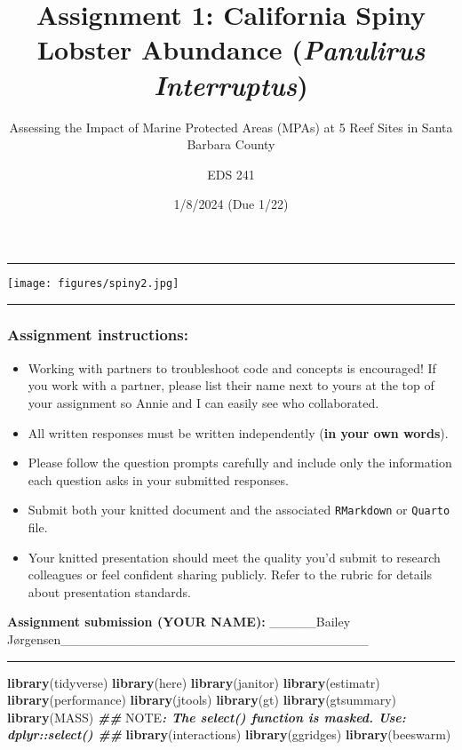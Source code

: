 \documentclass[
]{article}
\title{Assignment 1: California Spiny Lobster Abundance (\emph{Panulirus
Interruptus})}
\subtitle{Assessing the Impact of Marine Protected Areas (MPAs) at 5
Reef Sites in Santa Barbara County}
\author{EDS 241}
\date{1/8/2024 (Due 1/22)}
\newenvironment{Shaded}{\begin{snugshade}}{\end{snugshade}}
\newcommand{\AlertTok}[1]{\textcolor[rgb]{0.94,0.16,0.16}{#1}}
\newcommand{\DocumentationTok}[1]{\textcolor[rgb]{0.56,0.35,0.01}{\textbf{\textit{#1}}}}
\newcommand{\FunctionTok}[1]{\textcolor[rgb]{0.13,0.29,0.53}{\textbf{#1}}}
\newcommand{\NormalTok}[1]{#1}
\begin{document}
\maketitle

\begin{center}\rule{0.5\linewidth}{0.5pt}\end{center}

\texttt{[image: figures/spiny2.jpg]}

\begin{center}\rule{0.5\linewidth}{0.5pt}\end{center}

\subsubsection{Assignment instructions:}\label{assignment-instructions}

\begin{itemize}
\item
  Working with partners to troubleshoot code and concepts is encouraged!
  If you work with a partner, please list their name next to yours at
  the top of your assignment so Annie and I can easily see who
  collaborated.
\item
  All written responses must be written independently (\textbf{in your
  own words}).
\item
  Please follow the question prompts carefully and include only the
  information each question asks in your submitted responses.
\item
  Submit both your knitted document and the associated
  \texttt{RMarkdown} or \texttt{Quarto} file.
\item
  Your knitted presentation should meet the quality you'd submit to
  research colleagues or feel confident sharing publicly. Refer to the
  rubric for details about presentation standards.
\end{itemize}

\textbf{Assignment submission (YOUR NAME):} \_\_\_\_\_Bailey
Jørgensen\_\_\_\_\_\_\_\_\_\_\_\_\_\_\_\_\_\_\_\_\_\_\_\_\_\_\_\_\_\_\_\_\_

\begin{center}\rule{0.5\linewidth}{0.5pt}\end{center}

\begin{Shaded}
\begin{Highlighting}[]
\FunctionTok{library}\NormalTok{(tidyverse)}
\FunctionTok{library}\NormalTok{(here)}
\FunctionTok{library}\NormalTok{(janitor)}
\FunctionTok{library}\NormalTok{(estimatr)  }
\FunctionTok{library}\NormalTok{(performance)}
\FunctionTok{library}\NormalTok{(jtools)}
\FunctionTok{library}\NormalTok{(gt)}
\FunctionTok{library}\NormalTok{(gtsummary)}
\FunctionTok{library}\NormalTok{(MASS) }\DocumentationTok{\#\# }\AlertTok{NOTE}\DocumentationTok{: The \textasciigrave{}select()\textasciigrave{} function is masked. Use: \textasciigrave{}dplyr::select()\textasciigrave{} \#\#}
\FunctionTok{library}\NormalTok{(interactions) }
\FunctionTok{library}\NormalTok{(ggridges)}
\FunctionTok{library}\NormalTok{(beeswarm)}
\end{Highlighting}
\end{Shaded}
\end{document}
